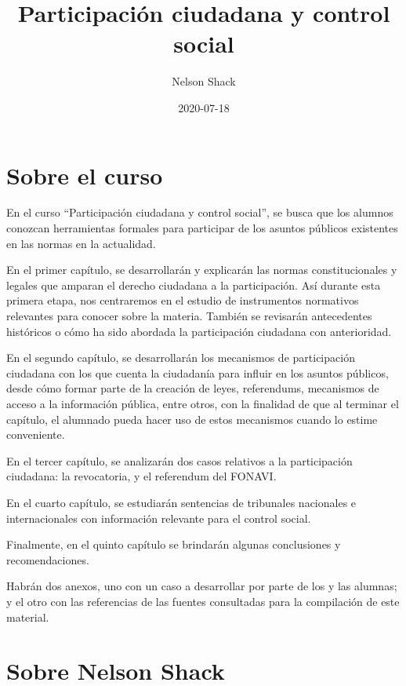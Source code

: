 \documentclass[
]{book}
\title{Participación ciudadana y control social}
\author{Nelson Shack}
\date{2020-07-18}
\begin{document}
\maketitle

{
\setcounter{tocdepth}{1}
\tableofcontents
}
\hypertarget{sobre-el-curso}{%
\chapter*{Sobre el curso}\label{sobre-el-curso}}

En el curso ``Participación ciudadana y control social'', se busca que los alumnos conozcan herramientas formales para participar de los asuntos públicos existentes en las normas en la actualidad.

En el primer capítulo, se desarrollarán y explicarán las normas constitucionales y legales que amparan el derecho ciudadana a la participación. Así durante esta primera etapa, nos centraremos en el estudio de instrumentos normativos relevantes para conocer sobre la materia. También se revisarán antecedentes históricos o cómo ha sido abordada la participación ciudadana con anterioridad.

En el segundo capítulo, se desarrollarán los mecanismos de participación ciudadana con los que cuenta la ciudadanía para influir en los asuntos públicos, desde cómo formar parte de la creación de leyes, referendums, mecanismos de acceso a la información pública, entre otros, con la finalidad de que al terminar el capítulo, el alumnado pueda hacer uso de estos mecanismos cuando lo estime conveniente.

En el tercer capítulo, se analizarán dos casos relativos a la participación ciudadana: la revocatoria, y el referendum del FONAVI.

En el cuarto capítulo, se estudiarán sentencias de tribunales nacionales e internacionales con información relevante para el control social.

Finalmente, en el quinto capítulo se brindarán algunas conclusiones y recomendaciones.

Habrán dos anexos, uno con un caso a desarrollar por parte de los y las alumnas; y el otro con las referencias de las fuentes consultadas para la compilación de este material.

\hypertarget{sobre-nelson-shack}{%
\chapter*{Sobre Nelson Shack}\label{sobre-nelson-shack}}
\end{document}
